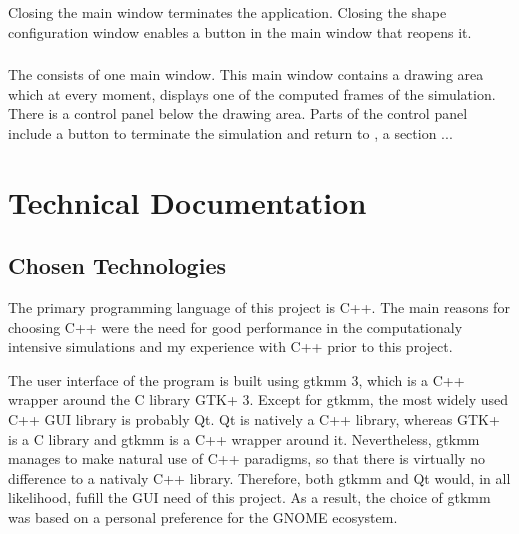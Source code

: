 \documentclass{article}
\newcommand{\vxlisp}{\vspace*{12pt}}
\begin{document}
\vxlisp

Closing the main window terminates the application. Closing the shape configuration window enables a button in the main window that reopens it.

\subsubsection{\Itwo}\label{sec:i2}

The \itwo{} consists of one main window. This main window contains a drawing area which at every moment, displays one of the computed frames of the simulation. There is a control panel below the drawing area. Parts of the control panel include a button to terminate the simulation and return to \ione{}, a section  ...

\section{Technical Documentation}
\subsection{Chosen Technologies}
The primary programming language of this project is C++. The main reasons for choosing C++ were the need for good performance in the computationaly intensive simulations and my experience with C++ prior to this project.
\vxlisp

The user interface of the program is built using gtkmm 3, which is a C++ wrapper around the C library GTK+ 3. Except for gtkmm, the most widely used C++ GUI library is probably Qt. Qt is natively a C++ library, whereas GTK+ is a C library and gtkmm is a C++ wrapper around it. Nevertheless, gtkmm manages to make natural use of C++ paradigms, so that there is virtually no difference to a nativaly C++ library. Therefore, both gtkmm and Qt would, in all likelihood, fufill the GUI need of this project. As a result, the choice of gtkmm was based on a personal preference for the GNOME ecosystem.
\end{document}
